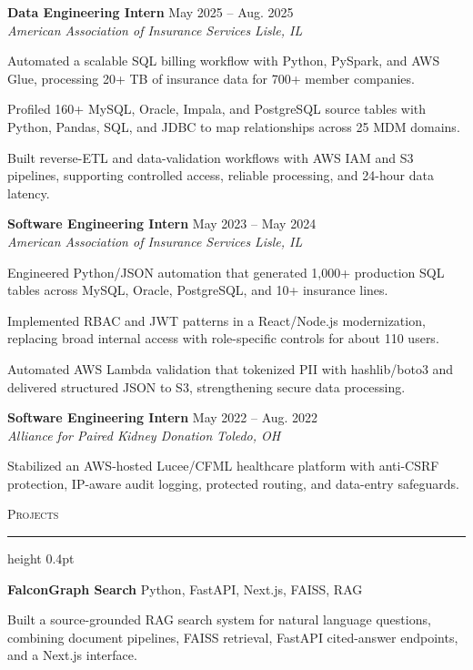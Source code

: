 \documentclass[letterpaper,11pt]{article}
\newcommand{\resumesection}[1]{%
  \par\vspace{2pt}%
  {\large\scshape #1}\par\vspace{2pt}%
  \hrule height 0.4pt\vspace{2pt}%
}
\newcommand{\resumeSubheading}[4]{
  \textbf{#1} \hfill #2\\
  \textit{#3} \hfill \textit{#4}
}
\newcommand{\projectHeading}[2]{
  \textbf{#1} \hfill #2
}
\begin{document}
\resumeSubheading
{Data Engineering Intern}{May 2025 -- Aug. 2025}
{American Association of Insurance Services}{Lisle, IL}
\begin{tightitemize}
  \item Automated a scalable SQL billing workflow with Python, PySpark, and AWS Glue, processing 20+ TB of insurance data for 700+ member companies.
  \item Profiled 160+ MySQL, Oracle, Impala, and PostgreSQL source tables with Python, Pandas, SQL, and JDBC to map relationships across 25 MDM domains.
  \item Built reverse-ETL and data-validation workflows with AWS IAM and S3 pipelines, supporting controlled access, reliable processing, and 24-hour data latency.
\end{tightitemize}

\resumeSubheading
{Software Engineering Intern}{May 2023 -- May 2024}
{American Association of Insurance Services}{Lisle, IL}
\begin{tightitemize}
  \item Engineered Python/JSON automation that generated 1,000+ production SQL tables across MySQL, Oracle, PostgreSQL, and 10+ insurance lines.
  \item Implemented RBAC and JWT patterns in a React/Node.js modernization, replacing broad internal access with role-specific controls for about 110 users.
  \item Automated AWS Lambda validation that tokenized PII with hashlib/boto3 and delivered structured JSON to S3, strengthening secure data processing.
\end{tightitemize}

\resumeSubheading
{Software Engineering Intern}{May 2022 -- Aug. 2022}
{Alliance for Paired Kidney Donation}{Toledo, OH}
\begin{tightitemize}
  \item Stabilized an AWS-hosted Lucee/CFML healthcare platform with anti-CSRF protection, IP-aware audit logging, protected routing, and data-entry safeguards.
\end{tightitemize}

\resumesection{Projects}
\projectHeading{FalconGraph Search}{Python, FastAPI, Next.js, FAISS, RAG}
\begin{tightitemize}
  \item Built a source-grounded RAG search system for natural language questions, combining document pipelines, FAISS retrieval, FastAPI cited-answer endpoints, and a Next.js interface.
\end{tightitemize}
\end{document}
